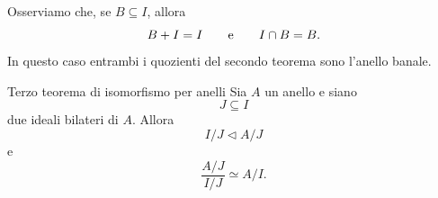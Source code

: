 \documentclass[a4paper]{article}
\begin{document}
\begin{radioactive}
Osserviamo che, se \(B\subseteq I\), allora
\[
    B+I=I
    \qquad
    \text{e}
    \qquad
    I\cap B=B.
\]
In questo caso entrambi i quozienti del secondo teorema sono l'anello banale.
\end{radioactive}

\begin{radioactive}
\begin{snippettheorem}{Terzo teorema di isomorfismo per anelli}
    Sia \(A\) un anello e siano
    \[
        J\subseteq I
    \]
    due ideali bilateri di \(A\).
    Allora
    \[
        I/J\triangleleft A/J
    \]
    e
    \[
        \frac{A/J}{I/J}
        \simeq
        A/I.
    \]
\end{snippettheorem}
\end{radioactive}
\end{document}
